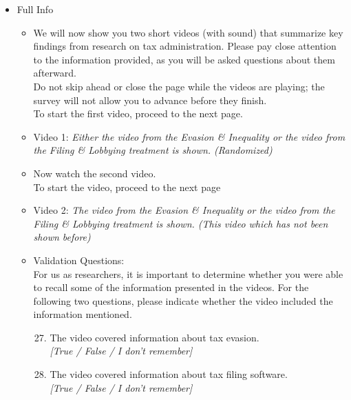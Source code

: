 \documentclass[11pt]{article}
\begin{document}
\begin{itemize}
\begin{itemize}
        For us as researchers, it is important to determine whether you were able to recall some of the information presented in the videos. For the following two questions, please indicate whether the video included the information mentioned.
        \begin{enumerate}
        \setcounter{enumi}{26}
        \item The video covered information about tax evasion. \\ \textit{[True / False / I don’t remember]}
        \item The video covered information about tax filing software. \\ \textit{[True / False / I don’t remember]}
        \end{enumerate}
    \end{itemize}
    \item Full Info
    \begin{itemize}
    \item We will now show you two short videos (with sound) that summarize key findings from research on tax administration. Please pay close attention to the information provided, as you will be asked questions about them afterward.\\[0.5em] Do not skip ahead or close the page while the videos are playing; the survey will not allow you to advance before they finish.\\[0.5em] To start the first video, proceed to the next page.
    \item Video 1: \textit{Either the video from the Evasion \& Inequality or the video from the Filing \& Lobbying treatment is shown. (Randomized)}
    \item Now watch the second video.\\[0.5em]
To start the video, proceed to the next page
    \item Video 2: \textit{The video from the Evasion \& Inequality or the video from the Filing \& Lobbying treatment is shown. (This video which has not been shown before)}
    \item Validation Questions: \\
        For us as researchers, it is important to determine whether you were able to recall some of the information presented in the videos. For the following two questions, please indicate whether the video included the information mentioned.
        \begin{enumerate}
        \setcounter{enumi}{26}
        \item The video covered information about tax evasion. \\ \textit{[True / False / I don’t remember]}
        \item The video covered information about tax filing software. \\ \textit{[True / False / I don’t remember]}
        \end{enumerate}
    \end{itemize}
\end{itemize}
\end{document}
